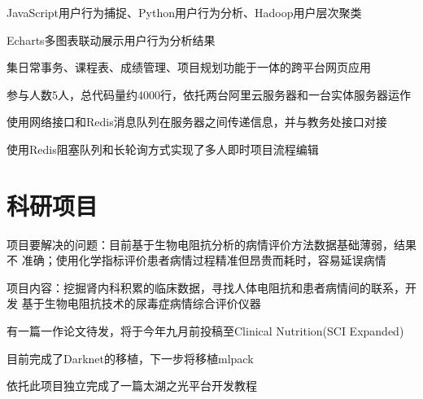 \documentclass[]{deedy-resume-openfont}
\begin{document}
\begin{minipage}[t]{0.73\textwidth}
	\begin{tightemize}
		\item JavaScript用户行为捕捉、Python用户行为分析、Hadoop用户层次聚类
		\item Echarts多图表联动展示用户行为分析结果
	\end{tightemize}
	\sectionsep

	\begin{tightemize}
		\item 集日常事务、课程表、成绩管理、项目规划功能于一体的跨平台网页应用
		\item 参与人数5人，总代码量约4000行，依托两台阿里云服务器和一台实体服务器运作
		\item 使用网络接口和Redis消息队列在服务器之间传递信息，并与教务处接口对接
		\item 使用Redis阻塞队列和长轮询方式实现了多人即时项目流程编辑
	\end{tightemize}
	\sectionsep
	
	\section{科研项目}
	\descript{}
	\begin{tightemize}
		\item 项目要解决的问题：目前基于生物电阻抗分析的病情评价方法数据基础薄弱，结果不 准确；使用化学指标评价患者病情过程精准但昂贵而耗时，容易延误病情
        \item 项目内容：挖掘肾内科积累的临床数据，寻找人体电阻抗和患者病情间的联系，开发 基于生物电阻抗技术的尿毒症病情综合评价仪器
		\item 有一篇一作论文待发，将于今年九月前投稿至Clinical Nutrition(SCI Expanded)
	\end{tightemize}
	\sectionsep

	\descript{}
	\begin{tightemize}
		\item 目前完成了Darknet的移植，下一步将移植mlpack
		\item 依托此项目独立完成了一篇太湖之光平台开发教程
	\end{tightemize}
    \sectionsep
	

\end{minipage}
\end{document}
